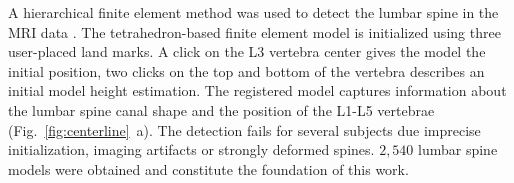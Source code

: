 \documentclass[a4paper,twoside]{style/article}
\newcommand{\com}[1]{\textcolor{orange}{\uline{#1}}}
\begin{document}
A hierarchical finite element method was used to detect the lumbar spine in the MRI data \cite{Rak2013}.
The tetrahedron-based finite element model is initialized using three user-placed land marks.
A click on the L3 vertebra center gives the model the initial position, two clicks on the top and bottom of the vertebra describes an initial model height estimation.
The registered model captures information about the lumbar spine canal shape and the position of the L1-L5 vertebrae \cite{Klemm2013VMV} (Fig.~\ref{fig:centerline}~a).
The detection fails for several subjects due imprecise initialization, imaging artifacts or strongly deformed spines.
$2,540$ lumbar spine models were obtained and constitute the foundation of this work.
\end{document}
